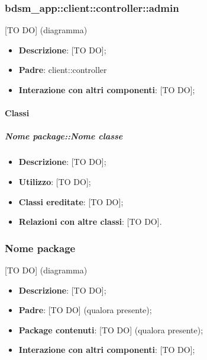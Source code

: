 	\subsubsection{bdsm\_app::client::controller::admin} %
	\label{ssub:bdsm_app_client_controller_admin}
	[TO DO] (diagramma) \newline \newline

	\begin{itemize}
		\item \textbf{Descrizione}: [TO DO];
		\item \textbf{Padre}: client::controller
		\item \textbf{Interazione con altri componenti}: [TO DO];
	\end{itemize}

		\paragraph{Classi} %
			\subparagraph{Nome package::Nome classe} %
			\label{subp:subparagraph_name}
				\begin{itemize}
					\item \textbf{Descrizione}: [TO DO];
					\item \textbf{Utilizzo}: [TO DO];
					\item \textbf{Classi ereditate}: [TO DO];
					\item \textbf{Relazioni con altre classi}: [TO DO].
				\end{itemize}




	\subsubsection{Nome package} %
	\label{ssub:nome_del_package}
	[TO DO] (diagramma) \newline \newline

	\begin{itemize}
		\item \textbf{Descrizione}: [TO DO];
		\item \textbf{Padre}: [TO DO] (qualora presente);
		\item \textbf{Package contenuti}: [TO DO] (qualora presente);
		\item \textbf{Interazione con altri componenti}: [TO DO];
	\end{itemize}

